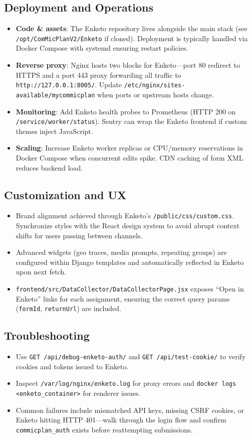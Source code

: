 \documentclass[11pt]{article}
\begin{document}
\subsection{Deployment and Operations}
\begin{itemize}[leftmargin=*]
  \item \textbf{Code \& assets}: The Enketo repository lives alongside the main stack (see \texttt{/opt/ComMicPlanV2/Enketo} if cloned). Deployment is typically handled via Docker Compose with systemd ensuring restart policies.
  \item \textbf{Reverse proxy}: Nginx hosts two blocks for Enketo—port 80 redirect to HTTPS and a port 443 proxy forwarding all traffic to \texttt{http://127.0.0.1:8005/}. Update \texttt{/etc/nginx/sites-available/mycommicplan} when ports or upstream hosts change.
  \item \textbf{Monitoring}: Add Enketo health probes to Prometheus (HTTP 200 on \texttt{/service/worker/status}). Sentry can wrap the Enketo frontend if custom themes inject JavaScript.
  \item \textbf{Scaling}: Increase Enketo worker replicas or CPU/memory reservations in Docker Compose when concurrent edits spike. CDN caching of form XML reduces backend load.
\end{itemize}

\subsection{Customization and UX}
\begin{itemize}[leftmargin=*]
  \item Brand alignment achieved through Enketo's \texttt{/public/css/custom.css}. Synchronize styles with the React design system to avoid abrupt context shifts for users passing between channels.
  \item Advanced widgets (geo traces, media prompts, repeating groups) are configured within Django templates and automatically reflected in Enketo upon next fetch.
  \item \texttt{frontend/src/DataCollector/DataCollectorPage.jsx} exposes “Open in Enketo” links for each assignment, ensuring the correct query params (\texttt{formId}, \texttt{returnUrl}) are included.
\end{itemize}

\subsection{Troubleshooting}
\begin{itemize}[leftmargin=*]
  \item Use \verb|GET /api/debug-enketo-auth/| and \verb|GET /api/test-cookie/| to verify cookies and tokens issued to Enketo.
  \item Inspect \texttt{/var/log/nginx/enketo.log} for proxy errors and \texttt{docker logs <enketo\_container>} for renderer issues.
  \item Common failures include mismatched API keys, missing CSRF cookies, or Enketo hitting HTTP 401—walk through the login flow and confirm \texttt{commicplan\_auth} exists before reattempting submissions.
\end{itemize}
\end{document}
